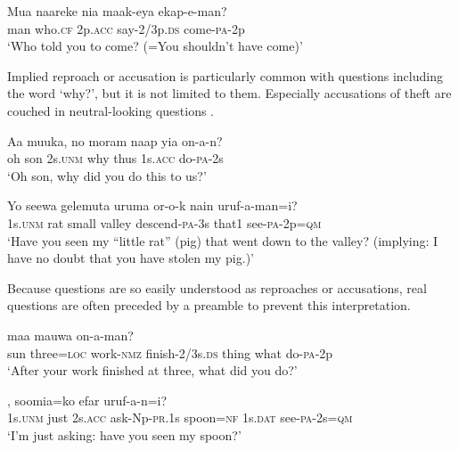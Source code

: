 \ea%
\label{ex:7:x1207}
\gll Mua  naareke  nia  maak-eya  ekap-e-man? \\
man  who.\textsc{cf}  2p.\textsc{acc}  say-2/3p.\textsc{ds}  come-\textsc{pa}-2p      \\
\glt `Who told you to come? (=You shouldn't have come)'
\z





Implied reproach or accusation is particularly common with  questions including the word  `why?', but it is not limited to them. Especially accusations of theft are couched in neutral-looking questions .

\ea%
\label{ex:7:x1208}
\gll Aa  muuka,  no  moram  naap  yia  on-a-n? \\
oh  son  2s.\textsc{unm}  why  thus  1s.\textsc{acc}  do-\textsc{pa}-2s      \\
\glt `Oh son, why did you do this to us?'
\z





\ea%
\label{ex:7:x1209}
\gll Yo  seewa  gelemuta  uruma  or-o-k  nain  uruf-a-man=i? \\
 1s.\textsc{unm}  rat  small  valley  descend-\textsc{pa}-3s  that1  see-\textsc{pa}-2p=\textsc{qm}     \\
\glt `Have you seen my ``little rat'' (pig) that went down to the valley? (implying: I have no doubt that you have stolen my pig.)'
\z




Because questions are so easily understood as reproaches or accusations, real questions are often preceded by a preamble to prevent this interpretation.

\ea%
\label{ex:7:x1210}
\gll [Ama  arow=pa  mauw-owa  weeser-eya]  maa  mauwa  on-a-man? \\
 sun  three=\textsc{loc}  work-\textsc{nmz}  finish-2/3s.\textsc{ds}  thing  what  do-\textsc{pa}-2p     \\
\glt `After your work finished at three, what did you do?'
\z





\ea%
\label{ex:7:x1211}
,  soomia=ko  efar uruf-a-n=i? \\
1s.\textsc{unm}  just  2s.\textsc{acc}  ask-Np-\textsc{pr}.1s  spoon=\textsc{nf}  1s.\textsc{dat}  see-\textsc{pa}-2s=\textsc{qm}    \\
\glt `I'm just asking: have you seen my spoon?'
\z









